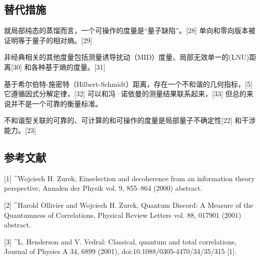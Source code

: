 \subsection{ 替代措施}
就局部纯态的蒸馏而言，一个可操作的度量是“量子缺陷”。[28] 单向和零向版本被证明等于量子的相对熵。[29]

非经典相关的其他度量包括测量诱导扰动（MID）度量、局部无效单一的(LNU)距离[30] 和各种基于熵的度量。[31]

基于希尔伯特-施密特（Hilbert-Schmidt）距离，存在一个不和谐的几何指标，[5] 它遵循因式分解定律，[32] 可以和冯·诺依曼的测量结果联系起来，[33] 但总的来说并不是一个可靠的衡量标准。

不和谐型关联的可靠的、可计算的和可操作的度量是局部量子不确定性[22] 和干涉能力。[23]

\subsection{参考文献}
[1]
^Wojciech H. Zurek, Einselection and decoherence from an information theory perspective, Annalen der Physik vol. 9, 855–864 (2000) abstract.

[2]
^Harold Ollivier and Wojciech H. Zurek, Quantum Discord: A Measure of the Quantumness of Correlations, Physical Review Letters vol. 88, 017901 (2001) abstract.

[3]
^L. Henderson and V. Vedral: Classical, quantum and total correlations, Journal of Physics A 34, 6899 (2001), doi:10.1088/0305-4470/34/35/315 [1].

